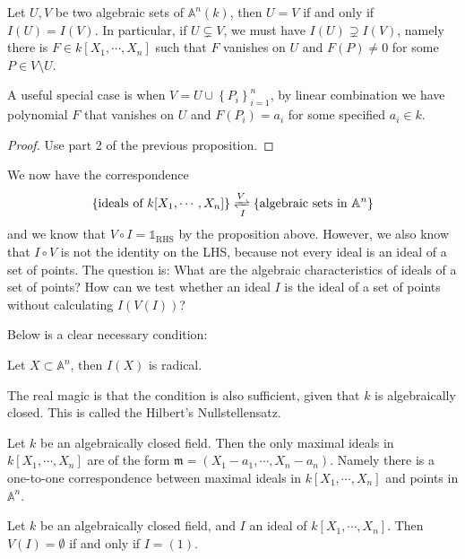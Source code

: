 \documentclass{note-eng}
\begin{document}
\begin{corollary} \label{cor:affine-strict-inclusion}
    Let $U, V$ be two algebraic sets of $\mathbb{A}^n(k)$, then $U = V$ if and only if $I(U) = I(V)$. In particular, if $U \subsetneq V$, we must have $I(U) \supsetneq I(V)$, namely there is $F \in k[X_1, \cdots, X_n]$ such that $F$ vanishes on $U$ and $F(P) \ne 0$ for some $P \in V \setminus U$.

    A useful special case is when $V = U \cup \left\lbrace P_i \right\rbrace_{i = 1}^n$, by linear combination we have polynomial $F$ that vanishes on $U$ and $F(P_i) = a_i$ for some specified $a_i \in k$.
\end{corollary}

\begin{proof}
    Use part 2 of the previous proposition.
\end{proof}

We now have the correspondence
$$\left\lbrace \text{ideals of } k[X_1, \cdots, X_n] \right\rbrace \xrightleftharpoons[I]{V} \left\lbrace \text{algebraic sets in } \mathbb{A}^n \right\rbrace$$
and we know that $V \circ I = \mathds{1}_{\mathrm{RHS}}$ by the proposition above. However, we also know that $I \circ V$ is not the identity on the LHS, because not every ideal is an ideal of a set of points. The question is: What are the algebraic characteristics of ideals of a set of points? How can we test whether an ideal $I$ is the ideal of a set of points without calculating $I(V(I))$?

Below is a clear necessary condition:

\begin{proposition}
    Let $X \subset \mathbb{A}^n$, then $I(X)$ is radical.
\end{proposition}

The real magic is that the condition is also sufficient, given that $k$ is algebraically closed. This is called the Hilbert's Nullstellensatz.

\begin{theorem}
    Let $k$ be an algebraically closed field. Then the only maximal ideals in $k[X_1, \cdots, X_n]$ are of the form $\mathfrak{m} = (X_1 - a_1, \cdots, X_n - a_n)$. Namely there is a one-to-one correspondence between maximal ideals in $k[X_1, \cdots, X_n]$ and points in $\mathbb{A}^n$.
\end{theorem}

\begin{corollary}
    Let $k$ be an algebraically closed field, and $I$ an ideal of $k[X_1, \cdots, X_n]$. Then $V(I) = \emptyset$ if and only if $I = (1)$.
\end{corollary}
\end{document}
